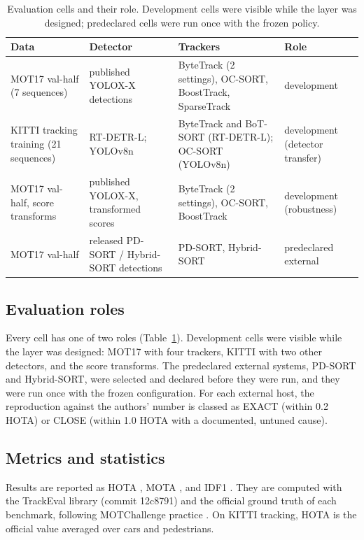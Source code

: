 \documentclass[pdflatex,sn-mathphys-num,iicol]{sn-jnl}
\begin{document}
\begin{table}[t]
\caption{Evaluation cells and their role. Development cells were visible while
the layer was designed; predeclared cells were run once with the frozen
policy.}
\label{tab:data}
\centering\footnotesize
\setlength{\tabcolsep}{4pt}
\begin{tabular}{@{}>{\raggedright\arraybackslash}p{36mm}>{\raggedright\arraybackslash}p{32mm}>{\raggedright\arraybackslash}p{50mm}>{\raggedright\arraybackslash}p{30mm}@{}}
\toprule
Data & Detector & Trackers & Role\\
\midrule
MOT17 val-half (7 sequences) & published YOLOX-X detections & ByteTrack (2 settings), OC-SORT, BoostTrack, SparseTrack & development\\
KITTI tracking training (21 sequences) & RT-DETR-L; YOLOv8n & ByteTrack and BoT-SORT (RT-DETR-L); OC-SORT (YOLOv8n) & development (detector transfer)\\
MOT17 val-half, score transforms & published YOLOX-X, transformed scores & ByteTrack (2 settings), OC-SORT, BoostTrack & development (robustness)\\
MOT17 val-half & released PD-SORT / Hybrid-SORT detections & PD-SORT, Hybrid-SORT & predeclared external\\
\bottomrule
\end{tabular}
\end{table}

\subsection{Evaluation roles}\label{sec:roles}
Every cell has one of two roles (Table~\ref{tab:data}). Development cells
were visible while the layer was designed: MOT17 with four trackers, KITTI
with two other detectors, and the score transforms. The predeclared external
systems, PD-SORT and Hybrid-SORT, were selected and declared before they were
run, and they were run once with the frozen configuration. For each external
host, the reproduction against the authors' number is classed as EXACT
(within 0.2 HOTA) or CLOSE (within 1.0 HOTA with a documented, untuned
cause).

\subsection{Metrics and statistics}\label{sec:metrics}
Results are reported as HOTA \cite{luiten2021hota}, MOTA
\cite{bernardin2008clear}, and IDF1 \cite{ristani2016idf1}. They are computed
with the TrackEval library (commit 12c8791) and the official ground truth of
each benchmark, following MOTChallenge practice
\cite{dendorfer2021motchallenge}. On KITTI tracking, HOTA is the official
value averaged over cars and pedestrians.
\end{document}
